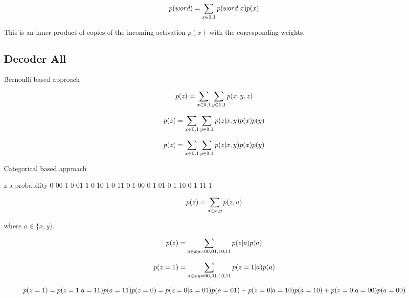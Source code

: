 \begin{equation}
    p(word) = \sum_{x \in 0, 1} p(word|x)p(x) \\
\end{equation}

This is an inner product of copies of the incoming activation $p(x)$ with the corresponding weights.

\subsection{Decoder All}

Bernoulli based approach

\begin{equation}
    p(z) = \sum_{x \in 0, 1}\sum_{y \in 0, 1} p(x, y, z) \\
\end{equation}

\begin{equation}
    p(z) = \sum_{x \in 0, 1}\sum_{y \in 0, 1} p(z|x, y)p(x)p(y) \\
\end{equation}

\begin{equation}
    p(z) = \sum_{x \in 0, 1}\sum_{y \in 0, 1} p(z|x, y)p(x)p(y) \\
\end{equation}

Categorical based approach

z a  probability
0 00 1
0 01 1
0 10 1
0 11 0
1 00 0
1 01 0
1 10 0
1 11 1

\begin{equation}
    p(z) = \sum_{a \in x, y} p(z, a) \\
\end{equation}

where $a \in \{x, y\}$.

\begin{equation}
    p(z) = \sum_{a \in xy = 00, 01, 10, 11} p(z|a) p(a) \\
\end{equation}

\begin{equation}
    p(z=1) = \sum_{a \in xy = 00, 01, 10, 11} p(z=1|a) p(a) \\
\end{equation}

\begin{equation}
    p(z=1) = p(z=1|a=11) p(a=11) \\
    p(z=0) = p(z=0|a=01) p(a=01) + p(z=0|a=10) p(a=10) + p(z=0|a=00) p(a=00) \\
\end{equation}

